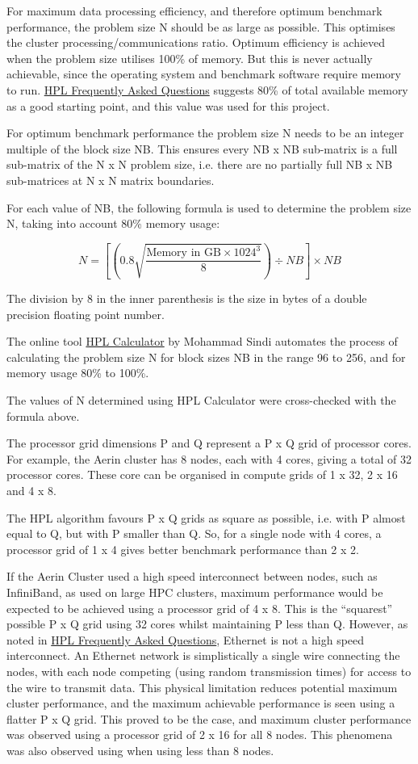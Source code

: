 \documentclass{report}
\begin{document}
For maximum data processing efficiency, and therefore optimum benchmark performance, the problem size N should be as large as possible. This optimises the cluster processing/communications ratio. Optimum efficiency is achieved when the problem size utilises 100\% of memory. But this is never actually achievable, since the operating system and benchmark software require memory to run. \href{https://www.netlib.org/benchmark/hpl/faqs.html}{HPL Frequently Asked Questions} suggests 80\% of total available memory as a good starting point, and this value was used for this project.

For optimum benchmark performance the problem size N needs to be an integer multiple of the block size NB. This ensures every NB x NB sub-matrix is a full sub-matrix of the N x N problem size, i.e. there are no partially full NB x NB sub-matrices at N x N matrix boundaries.

For each value of NB, the following formula is used to determine the problem size N, taking into account 80\% memory usage:

\[N = \left[\left(0.8 \sqrt{\frac{\text{Memory in GB} \times 1024^3}{8}}\right) \div NB\right] \times NB\]

The division by 8 in the inner parenthesis is the size in bytes of a double precision floating point number.


The online tool \href{http://hpl-calculator.sourceforge.net}{HPL Calculator} by Mohammad Sindi automates the process of calculating the problem size N for block sizes NB in the range 96 to 256, and for memory usage 80\% to 100\%.

The values of N determined using HPL Calculator were cross-checked with the formula above.

The processor grid dimensions P and Q represent a P x Q grid of processor cores. For example, the Aerin cluster has 8 nodes, each with 4 cores, giving a total of 32 processor cores. These core can be organised in compute grids of 1 x 32, 2 x 16 and 4 x 8.

The HPL algorithm favours P x Q grids as square as possible, i.e. with P almost equal to Q, but with P smaller than Q. So, for a single node with 4 cores, a processor grid of 1 x 4 gives better benchmark performance than 2 x 2.

If the Aerin Cluster used a high speed interconnect between nodes, such as InfiniBand, as used on large HPC clusters, maximum performance would be expected to be achieved using a processor grid of 4 x 8. This is the ``squarest'' possible P x Q grid using 32 cores whilst maintaining P less than Q. However, as noted in \href{https://www.netlib.org/benchmark/hpl/faqs.html}{HPL Frequently Asked Questions}, Ethernet is not a high speed interconnect. An Ethernet network is simplistically a single wire connecting the nodes, with each node competing (using random transmission times) for access to the wire to transmit data. This physical limitation reduces potential maximum cluster performance, and the maximum achievable performance is seen using a flatter P x Q grid. This proved to be the case, and maximum cluster performance was observed using a processor grid of 2 x 16 for all 8 nodes. This phenomena was also observed using when using less than 8 nodes.
\end{document}
